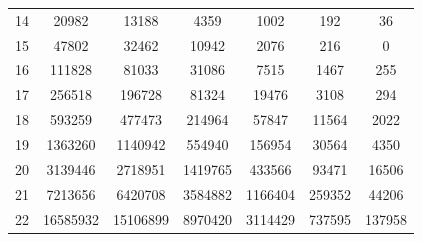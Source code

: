 \documentclass[11pt,a4paper]{article}
\begin{document}
\begin{table}[htbp]
\begin{subtable}{\textwidth}
\begin{tabular}{c|cccccc}
14 & 20982 & 13188 & 4359 & 1002 & 192    & 36           \\
15 & 47802 & 32462 & 10942 & 2076 & 216   & 0             \\
16 & 111828 & 81033 & 31086 & 7515 & 1467 & 255          \\
17 & 256518 & 196728 & 81324 & 19476 & 3108 & 294         \\
18 & 593259 & 477473 & 214964 & 57847 & 11564 & 2022     \\
19 & 1363260 & 1140942 & 554940 & 156954 & 30564 & 4350   \\
20 & 3139446 & 2718951 & 1419765 & 433566 & 93471 & 16506   \\
21 & 7213656 & 6420708 & 3584882 & 1166404 & 259352 & 44206   \\
22 & 16585932 & 15106899 & 8970420 & 3114429 & 737595 & 137958   \\
\bottomrule
\end{tabular}
\end{subtable}


\end{table}
\end{document}
